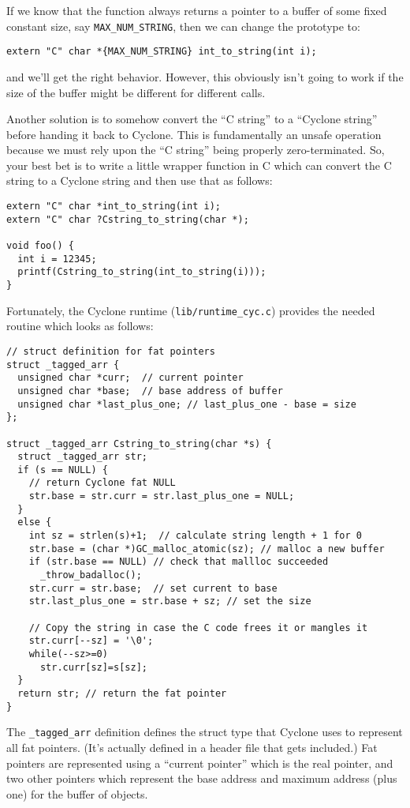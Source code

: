 If we know that the function always returns a pointer to a buffer of 
some fixed constant size, say \texttt{MAX\_NUM\_STRING}, then
we can change the prototype to:
\begin{verbatim}
extern "C" char *{MAX_NUM_STRING} int_to_string(int i);
\end{verbatim}
and we'll get the right behavior.  However, this obviously isn't
going to work if the size of the buffer might be different for
different calls.  

Another solution is to somehow convert the ``C string'' to a ``Cyclone
string'' before handing it back to Cyclone.  This is fundamentally
an unsafe operation because we must rely upon the ``C string'' being
properly zero-terminated.  So, your best bet is to write a little
wrapper function in C which can convert the C string to a Cyclone
string and then use that as follows:
\begin{verbatim}
extern "C" char *int_to_string(int i);
extern "C" char ?Cstring_to_string(char *);

void foo() {
  int i = 12345;
  printf(Cstring_to_string(int_to_string(i)));
}
\end{verbatim}
Fortunately, the Cyclone runtime (\texttt{lib/runtime\_cyc.c}) 
provides the needed routine which looks as follows:
\begin{verbatim}
// struct definition for fat pointers
struct _tagged_arr {
  unsigned char *curr;  // current pointer
  unsigned char *base;  // base address of buffer
  unsigned char *last_plus_one; // last_plus_one - base = size
};

struct _tagged_arr Cstring_to_string(char *s) {
  struct _tagged_arr str;
  if (s == NULL) {
    // return Cyclone fat NULL
    str.base = str.curr = str.last_plus_one = NULL;
  }
  else {
    int sz = strlen(s)+1;  // calculate string length + 1 for 0
    str.base = (char *)GC_malloc_atomic(sz); // malloc a new buffer
    if (str.base == NULL) // check that mallloc succeeded
      _throw_badalloc();
    str.curr = str.base;  // set current to base
    str.last_plus_one = str.base + sz; // set the size

    // Copy the string in case the C code frees it or mangles it
    str.curr[--sz] = '\0';
    while(--sz>=0)
      str.curr[sz]=s[sz];
  }
  return str; // return the fat pointer
}
\end{verbatim}
The \texttt{\_tagged\_arr} definition defines the struct type that
Cyclone uses to represent all fat pointers.  (It's actually defined
in a header file that gets included.)  Fat pointers are represented
using a ``current pointer'' which is the real pointer, and two
other pointers which represent the base address and maximum address
(plus one) for the buffer of objects.  

